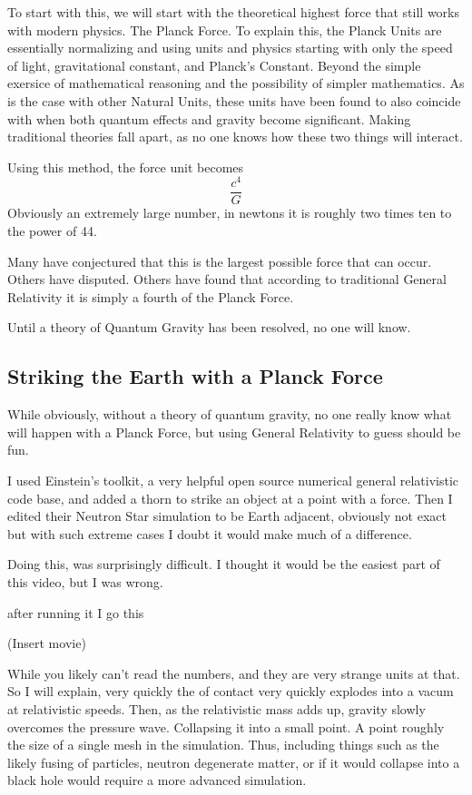 To start with this, we will start with the theoretical highest force that still works with modern physics. The Planck Force. To explain this, the Planck Units are essentially normalizing and using units and physics starting with only the speed of light, gravitational constant, and Planck's Constant. Beyond the simple exersice of mathematical reasoning and the possibility of simpler mathematics. As is the case with other Natural Units, these units have been found to also coincide with when both quantum effects and gravity become significant. Making traditional theories fall apart, as no one knows how these two things will interact.

Using this method, the force unit becomes
\[
	\frac{c^4}{G}
\]
Obviously an extremely large number, in newtons it is roughly two times ten to the power of 44.

Many have conjectured that this is the largest possible force that can occur. Others have disputed. Others have found that according to traditional General Relativity it is simply a fourth of the Planck Force.

Until a theory of Quantum Gravity has been resolved, no one will know.

\subsection{Striking the Earth with a Planck Force}

While obviously, without a theory of quantum gravity, no one really know what will happen with a Planck Force, but using General Relativity to guess should be fun.

I used Einstein's toolkit, a very helpful open source numerical general relativistic code base, and added a thorn to strike an object at a point with a force. Then I edited their Neutron Star simulation to be Earth adjacent, obviously not exact but with such extreme cases I doubt it would make much of a difference.

Doing this, was surprisingly difficult. I thought it would be the easiest part of this video, but I was wrong.

after running it I go this

(Insert movie)

While you likely can't read the numbers, and they are very strange units at that. So I will explain, very quickly the of contact very quickly explodes into a vacum at relativistic speeds. Then, as the relativistic mass adds up, gravity slowly overcomes the pressure wave. Collapsing it into a small point. A point roughly the size of a single mesh in the simulation. Thus, including things such as the likely fusing of particles, neutron degenerate matter, or if it would collapse into a black hole would require a more advanced simulation.

